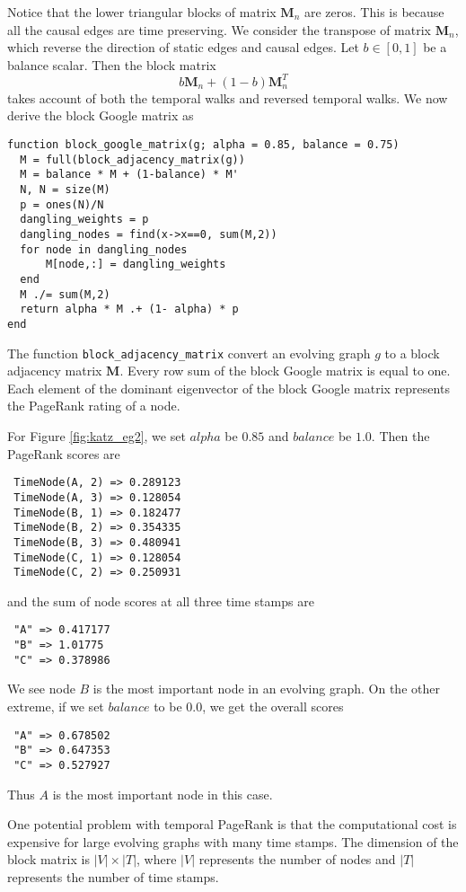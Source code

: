 \documentclass[12pt]{article}
\theoremstyle{definition}
\begin{document}
Notice that the lower triangular blocks of matrix $\bm M_n$ are zeros.
This is because all the causal edges are time preserving. We consider the transpose of matrix $\bm M_n$, which reverse the direction of static edges and causal edges.
Let $b \in [0,1]$ be a balance scalar. Then the block matrix
$$
b \bm M_n + (1-b) \bm M_n^T
$$
takes account of both the temporal walks and reversed temporal walks.
We now derive the block Google matrix as

\begin{lstlisting}
function block_google_matrix(g; alpha = 0.85, balance = 0.75)
  M = full(block_adjacency_matrix(g))
  M = balance * M + (1-balance) * M'
  N, N = size(M)
  p = ones(N)/N
  dangling_weights = p
  dangling_nodes = find(x->x==0, sum(M,2))
  for node in dangling_nodes
      M[node,:] = dangling_weights
  end
  M ./= sum(M,2)
  return alpha * M .+ (1- alpha) * p
end
\end{lstlisting}

The function \texttt{block\_adjacency\_matrix} convert an evolving graph $g$ to a block adjacency matrix $\bm M$. Every row sum of the block Google matrix is equal to one. Each element of the dominant eigenvector of the block Google matrix
represents the PageRank rating of a node.


For Figure \ref{fig:katz_eg2}, we set $alpha$ be $0.85$ and $balance$ be $1.0$.
Then the PageRank scores are
\begin{lstlisting}
 TimeNode(A, 2) => 0.289123
 TimeNode(A, 3) => 0.128054
 TimeNode(B, 1) => 0.182477
 TimeNode(B, 2) => 0.354335
 TimeNode(B, 3) => 0.480941
 TimeNode(C, 1) => 0.128054
 TimeNode(C, 2) => 0.250931
\end{lstlisting}
and the sum of node scores at all three time stamps are
\begin{lstlisting}
 "A" => 0.417177
 "B" => 1.01775
 "C" => 0.378986
\end{lstlisting}
We see node $B$ is the most important node in an evolving graph.
On the other extreme, if we set $balance$ to be $0.0$, we get the overall scores
\begin{lstlisting}
 "A" => 0.678502
 "B" => 0.647353
 "C" => 0.527927
\end{lstlisting}
Thus $A$ is the most important node in this case.

One potential problem with temporal PageRank is that the computational cost is expensive for large evolving graphs with many time stamps. The dimension of the block matrix
is $|V| \times |T|$, where $|V|$ represents the number of nodes and $|T|$ represents the number of time stamps.
\end{document}
